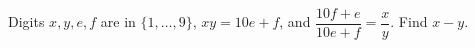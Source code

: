 Digits $x,y,e,f$ are in $\{1,\ldots,9\}$, $xy=10e+f$, and $\dfrac{10f+e}{10e+f}=\dfrac{x}{y}$. Find $x-y$.
